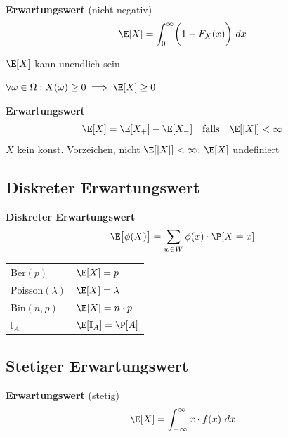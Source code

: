  \textbf{Erwartungswert} (nicht-negativ)
$$
    \E[X] = \int_{0}^{\infty} \biggl( 1-F_X(x) \biggr)\ dx
$$

{\scriptsize
    \remark $\E[X]$ kann unendlich sein
}

\theorem $\forall \omega \in \Omega: X(\omega) \geq 0 \implies \E[X] \geq 0$\\

 \textbf{Erwartungswert} 
$$
    \E[X] = \E[X_+] - \E[X_-] \quad\text{falls}\quad \E[|X|]<\infty
$$
{\scriptsize
    \remark $X$ kein konst. Vorzeichen, nicht $\E[|X|] < \infty $: $\E[X]$ undefiniert
}

\subsection{Diskreter Erwartungswert}

\theorem \textbf{Diskreter Erwartungswert}
$$
    \E\bigl[ \phi(X) \bigr] = \sum_{w \in W} \phi(x) \cdot \P[X = x]
$$

\begin{center}
    \begin{tabular}{l|l}
        $\text{Ber}(p)$             & $\E[X] = p$                   \\
        $\text{Poisson}(\lambda)$   & $\E[X] = \lambda$             \\
        $\text{Bin}(n,p)$           & $\E[X] = n\cdot p$            \\
        $\mathbb{I}_A$              & $\E[\mathbb{I}_A] = \P[A]$    \\
    \end{tabular}    
\end{center}

\subsection{Stetiger Erwartungswert}

 \textbf{Erwartungswert} (stetig)
$$ 
    \E[X] = \int_{-\infty}^{\infty} x \cdot f(x)\ dx
$$
